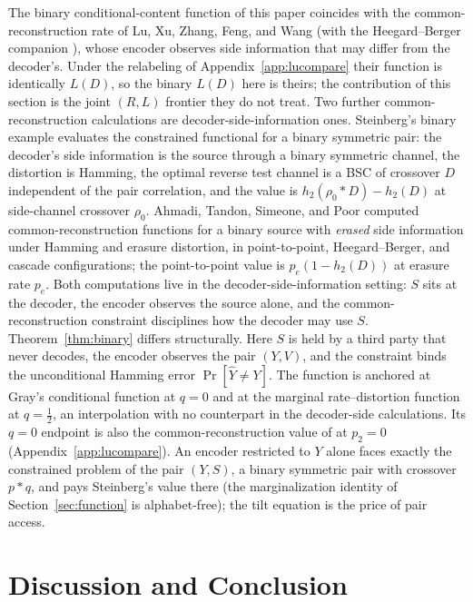 \documentclass[11pt,onecolumn]{IEEEtran}
\newcommand{\hY}{\widehat{Y}}
\begin{document}
The binary conditional-content function of this paper coincides with the
common-reconstruction rate of Lu, Xu, Zhang, Feng, and Wang
\cite{lu2016lossy} (with the Heegard--Berger companion \cite{lu2016binary}),
whose encoder observes side information that may differ from the decoder's.
Under the relabeling of Appendix~\ref{app:lucompare} their function is
identically $L(D)$, so the binary $L(D)$ here is theirs; the contribution of
this section is the joint $(R,L)$ frontier they do not treat. Two further
common-reconstruction calculations are decoder-side-information ones.
Steinberg's binary example
\cite{steinberg2009} evaluates the constrained functional for a binary
symmetric pair: the decoder's side information is the source through a
binary symmetric channel, the distortion is Hamming, the optimal
reverse test channel is a BSC of crossover $D$ independent of the pair
correlation, and the value is $h_2(\rho_0*D)-h_2(D)$ at side-channel
crossover $\rho_0$. Ahmadi, Tandon, Simeone, and Poor \cite{ahmadi2013}
computed common-reconstruction functions for a binary source with
\emph{erased} side information under Hamming and erasure distortion,
in point-to-point, Heegard--Berger, and cascade configurations; the
point-to-point value is $p_e(1-h_2(D))$ at erasure rate $p_e$. Both
computations live in the decoder-side-information setting: $S$ sits at
the decoder, the encoder observes the source alone, and the
common-reconstruction constraint disciplines how the decoder may use
$S$. Theorem~\ref{thm:binary} differs structurally. Here $S$ is held
by a third party that never decodes, the encoder observes the pair
$(Y,V)$, and the constraint binds the unconditional Hamming error
$\Pr[\hY\ne Y]$. The function is anchored at Gray's conditional
function at $q=0$ and at the marginal rate--distortion function at
$q=\tfrac12$, an interpolation with no counterpart in the
decoder-side calculations. Its $q=0$ endpoint is also the
common-reconstruction value of \cite{lu2016lossy} at $p_2=0$
(Appendix~\ref{app:lucompare}). An encoder restricted to $Y$ alone faces
exactly the constrained problem of the pair $(Y,S)$, a binary
symmetric pair with crossover $p*q$, and pays Steinberg's value there
(the marginalization identity of Section~\ref{sec:function} is
alphabet-free); the tilt equation is the price of pair access.

\section{Discussion and Conclusion}
\label{sec:discussion}
\end{document}
